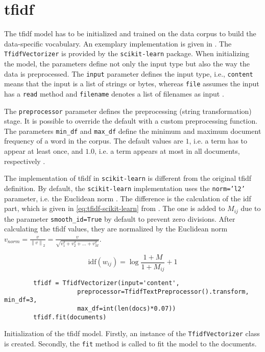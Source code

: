 \section{\ac{tfidf}}\label{sec:impl-tfidf}

The \ac{tfidf} model has to be initialized and trained on the data corpus to build the data-specific vocabulary.
An exemplary implementation is given in .
The \texttt{TfidfVectorizer} is provided by the \texttt{scikit-learn} package.
When initializing the model, the parameters define not only the input type but also the way the data is preprocessed.
The \texttt{input} parameter defines the input type, i.e., \texttt{content} means that the input is a list of strings or bytes, 
whereas \texttt{file} assumes the input has a \texttt{read} method and \texttt{filename} denotes a list of filenames as input \cite{tfidf-vec-scikit-learn}.

The \texttt{preprocessor} parameter defines the preprocessing (string transformation) stage.
It is possible to override the default with a custom preprocessing function.
The parameters \texttt{min\_df} and \texttt{max\_df} define the minimum and maximum document frequency of a word in the corpus.
The default values are $1$, i.e. a term has to appear at least once, and $1.0$, i.e. a term appears at most in all documents, respectively \cite{tfidf-vec-scikit-learn}.

The implementation of \ac{tfidf} in \texttt{scikit-learn} is different from the original \ac{tfidf} definition.
By default, the \texttt{scikit-learn} implementation uses the \texttt{norm='l2'} parameter, i.e. the Euclidean norm \cite{tfidf-scikit-learn}.
The difference is the calculation of the \ac{idf} part, which is given in \autoref{eq:tfidf-scikit-learn} from \cite{tfidf-scikit-learn}.
The one is added to $M_{ij}$ due to the parameter \texttt{smooth\_id=True} by default to prevent zero divisions.
After calculating the \ac{tfidf} values, they are normalized by the Euclidean norm 
$v_{norm} = \frac{v}{\left\| v \right\|_{2}} = \frac{v}{\sqrt{v_1^{2} + v_2^{2} + ... + v_M^{2}}}$.

\begin{equation}
    \text{idf}(w_{ij}) = \log \frac{1 + M}{1 + M_{ij}} + 1    
    \label{eq:tfidf-scikit-learn}
\end{equation}

\begin{listing}[htp]
    \begin{verbatim}
        tfidf = TfidfVectorizer(input='content', 
                    preprocessor=TfidfTextPreprocessor().transform, min_df=3, 
                    max_df=int(len(docs)*0.07))
        tfidf.fit(documents)
    \end{verbatim}
    \caption{Initialization of the \ac{tfidf} model.
    Firstly, an instance of the \texttt{TfidfVectorizer} class is created.
    Secondly, the \texttt{fit} method is called to fit the model to the documents.
    }
    \label{lst:impl-tfidf}
\end{listing}

